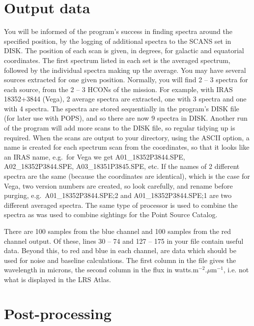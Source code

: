 \section{Output data}
You will be informed of the program's success in finding spectra around the
specified position, by the logging of additional spectra to the SCANS set
in DISK.
The position of each scan is given, in degrees, for galactic and equatorial
coordinates.
The first spectrum listed in each set is the averaged spectrum, followed by
the individual spectra making up the average.
You may have several sources extracted for one given position.
Normally, you will find 2 -- 3 spectra for each source, from the 2 -- 3
HCONs of the mission.
For example, with IRAS 18352+3844 (Vega), 2 average spectra are extracted,
one with 3 spectra and one with 4 spectra.
The spectra are stored sequentially in the program's DISK file (for later
use with POPS), and so there are now 9 spectra in DISK.
Another run of the program will add more scans to the DISK file, so regular
tidying up is required.
When the scans are output to your directory, using the ASCII option, a name
is created for each spectrum scan from the coordinates, so that it looks like
an IRAS name, e.g.\ for Vega we get A01\_18352P3844.SPE, A02\_18352P3844.SPE,
A03\_18351P3845.SPE, etc.
If the names of 2 different spectra are the same (because the coordinates are
identical), which is the case for Vega, two version numbers are created, so
look carefully, and rename before purging, e.g.\ A01\_18352P3844.SPE;2 and
A01\_18352P3844.SPE;1 are two different averaged spectra.
The same type of processor is used to combine the spectra as was used to
combine sightings for the Point Source Catalog.

There are 100 samples from the blue channel and 100 samples from the red
channel output.
Of these, lines 30 -- 74 and 127 -- 175 in your file contain useful data.
Beyond this, to red and blue in each channel, are data which should be used for
noise and baseline calculations.
The first column in the file gives the wavelength in microns, the second
column in the flux in watts.m$^{-2}$.$\mu$m$^{-1}$, i.e. not what is
displayed in the LRS Atlas.

\section{Post-processing}

